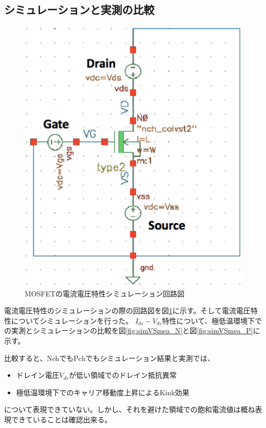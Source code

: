 		\subsection{シミュレーションと実測の比較}
			\begin{figure}[htbp]
				\begin{center}
					\includegraphics[clip,width=15.0cm]{./Chapter/Chapter5/Picture/simulation_circuit.eps}
					\caption{MOSFETの電流電圧特性シミュレーション回路図}
					\label{fig:simulation_circuit}
				\end{center}
			\end{figure}
			電流電圧特性のシミュレーションの際の回路図を図\ref{fig:simulation_circuit}に示す。そして電流電圧特性についてシミュレーションを行った。
			$I_{ds}-V_{ds}$特性について、極低温環境下での実測とシミュレーションの比較を図\ref{fig:simVSmea_N}と図\ref{fig:simVSmea_P}に示す。
			
			比較すると、NchでもPchでもシミュレーション結果と実測では、
			\begin{itemize}
				\item ドレイン電圧$V_{ds}$が低い領域でのドレイン抵抗異常
				\item 極低温環境下でのキャリア移動度上昇によるKink効果
			\end{itemize}
			について表現できていない。しかし、それを避けた領域での飽和電流値は概ね表現できていることは確認出来る。
			
